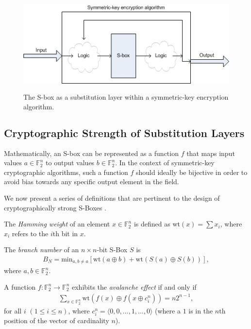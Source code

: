 \documentclass[11pt]{article}
\newcommand{\field}[1]{\mathbb{#1}} %
\begin{document}
\begin{figure}[!ht]
\centering
	\includegraphics[scale=0.75]{images/sub_layer.jpg} \\
	\label{sublayer}
	\caption{The S-box as a substitution layer within a symmetric-key encryption algorithm.}
\end{figure}

\subsection{Cryptographic Strength of Substitution Layers}
\label{strength}
Mathematically, an S-box can be represented as a function $f$ that maps input values $a \in \field{F}_2^n$ to output values $b \in \field{F}_2^n$. In the context of symmetric-key cryptographic algorithms, such a function $f$ should ideally be bijective in order to avoid bias towards any specific output element in the field. 

We now present a series of definitions that are pertinent to the design of cryptographically strong S-Boxes \cite{Mar_newanalysis}.


\begin{define}
The \emph{Hamming weight} of an element $x \in \field{F}_2^n$ is defined as wt$(x) = \sum x_i$, where $x_i$ refers to the $i$th bit in $x$.
\end{define}

\begin{define}
The \emph{branch number} of an $n \times n$-bit S-Box $S$ is
\begin{eqnarray}
B_N = \text{min}_{a, b\not=a}\left[\text{wt}(a \oplus b) + \text{wt}(S(a) \oplus S(b))\right],
\end{eqnarray}
where $a, b \in \field{F}_2^n$.%
\end{define}

\begin{define}
A function $f : \field{F}_2^n \to \field{F}_2^n$ exhibits the \emph{avalanche effect} if and only if 
\begin{eqnarray}
\sum_{x \in \field{F}_2^n} \text{wt}(f(x) \oplus f(x \oplus c_{i}^{n})) = n2^{n-1},
\end{eqnarray}
for all $i$ $(1 \leq i \leq n)$, where $c_{i}^{n} = \langle 0, 0, ..., 1, ..., 0 \rangle$ (where a $1$ is in the $n$th position of the vector of cardinality $n$).%
\end{define}
\end{document}
